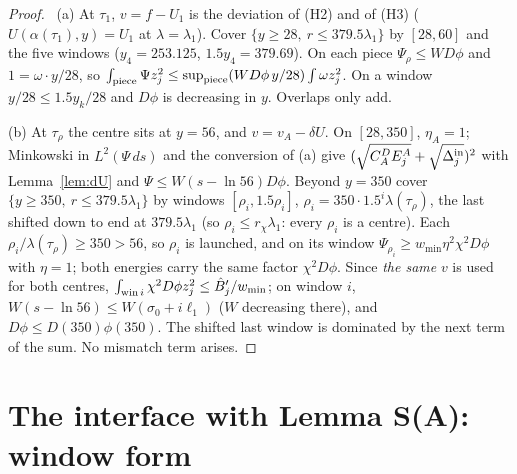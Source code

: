 \documentclass[11pt]{article}
\theoremstyle{definition}\newtheorem{definition}[theorem]{Definition}
\theoremstyle{remark}\newtheorem{remark}[theorem]{Remark}
\begin{document}
\begin{proof}\tP\ (a) At $\tau_1$, $v=f-U_1$ is the deviation of (H2) and of (H3) ($U(\alpha(\tau_1),y)=U_1$ at $\lambda=\lambda_1$). Cover $\{y\ge28,\ r\le379.5\lambda_1\}$ by $[28,60]$ and the five windows ($y_4=253.125$, $1.5y_4=379.69$). On each piece $\Psi_\rho\le W D\phi$ and $1=\omega\cdot y/28$, so $\int_{\rm piece}\Psi z_j^2\le\sup_{\rm piece}(WD\phi\,y/28)\int\omega z_j^2$. On a window $y/28\le1.5y_k/28$ and $D\phi$ is decreasing in $y$. Overlaps only add.

(b) At $\tau_\rho$ the centre sits at $y=56$, and $v=v_A-\delta U$. On $[28,350]$, $\eta_A=1$; Minkowski in $L^2(\Psi\,ds)$ and the conversion of (a) give $(\sqrt{C_A^DE^A_j}+\sqrt{\Delta^{\rm in}_j})^2$ with Lemma~\ref{lem:dU} and $\Psi\le W(s-\ln56)D\phi$. Beyond $y=350$ cover $\{y\ge350,\ r\le379.5\lambda_1\}$ by windows $[\rho_i,1.5\rho_i]$, $\rho_i=350\cdot1.5^i\lambda(\tau_\rho)$, the last shifted down to end at $379.5\lambda_1$ (so $\rho_i\le r_\chi\lambda_1$: every $\rho_i$ is a centre). Each $\rho_i/\lambda(\tau_\rho)\ge350>56$, so $\rho_i$ is launched, and on its window $\Psi_{\rho_i}\ge w_{\min}\eta^2\chi^2D\phi$ with $\eta=1$; both energies carry the same factor $\chi^2D\phi$. Since \emph{the same} $v$ is used for both centres, $\int_{{\rm win}\,i}\chi^2D\phi z_j^2\le\hat B'_j/w_{\min}$; on window $i$, $W(s-\ln56)\le W(\sigma_0+i\ell_1)$ ($W$ decreasing there), and $D\phi\le D(350)\phi(350)$. The shifted last window is dominated by the next term of the sum. No mismatch term arises.
\end{proof}

\section{The interface with Lemma S(A): window form}\label{sec:D}
\end{document}
